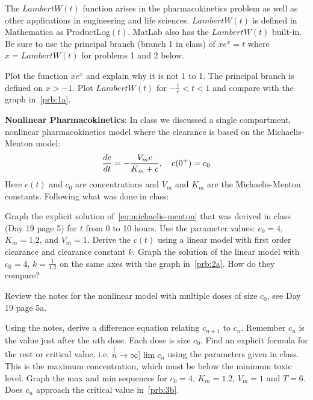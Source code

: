 \documentclass[
    number={8},
]{math486homework}
\begin{document}
\maketitle

The $LambertW(t)$ function arises in the pharmacokinetics problem as well as other applications in engineering and life sciences.
$LambertW(t)$ is defined in Mathematica as ProductLog$(t)$.
MatLab also has the $LambertW(t)$ built-in.
Be sure to use the principal branch (branch 1 in class) of $xe^{x} = t$ where $x = LambertW(t)$ for problems 1 and 2 below.

\begin{problems}
    \problem
    \begin{problems}
        \subproblem Plot the function $xe^{x}$ and explain why it is not 1 to 1.
        The principal branch is defined on $x > -1$. 
        \subproblem Plot $LambertW(t)$ for $-\frac{1}{e} < t < 1$ and compare with the graph in~\ref{prb:1a}. 
    \end{problems}
    \problem \textbf{Nonlinear Pharmacokinetics}: In class we discussed a single compartment, nonlinear pharmacokinetics model where the clearance is based on the Michaelis-Menton model:
    \begin{equation}
    	\frac{dc}{dt} = -\frac{V_{m}c}{K_{m} + c},\ \ \ c(0^{+}) = c_{0}\\
    	\label{eq:michaelis-menton}
    \end{equation}
    Here $c(t)$ and $c_{0}$ are concentrations and $V_{m}$ and $K_{m}$ are the Michaelis-Menton constants.
    Following what was done in class:
    \begin{problems}
        \subproblem Graph the explicit solution of~\eqref{eq:michaelis-menton} that was derived in class (Day 19 page 5) for $t$ from 0 to 10 hours.
        Use the parameter values: $c_{0} = 4$, $K_{m} = 1.2$, and $V_{m} = 1$. 
        \subproblem Derive the $c(t)$ using a linear model with first order clearance and clearance constant $k$.
        \subproblem Graph the solution of the linear model with $c_{0} = 4$, $k = \frac{1}{1.2}$ on the same axes with the graph in~\ref{prb:2a}.
        How do they compare? 
    \end{problems}
    \problem Review the notes for the nonlinear model with multiple doses of size $c_{0}$, see Day 19 page 5a.
    \begin{problems}
        \subproblem Using the notes, derive a difference equation relating $c_{n+1}$ to $c_{n}$.
        Remember $c_{n}$ is the value just after the $n$th dose.
        Each dose is size $c_{0}$. 
        \subproblem Find an explicit formula for the rest or critical value, i.e. $\stackrel[n\rightarrow \infty]{}{\lim} c_{n}$ using the parameters given in class.
        This is the maximum concentration, which must be below the minimum toxic level. 
        \subproblem Graph the max and min sequences for $c_{0} = 4$, $K_{m} = 1.2$, $V_{m} = 1$ and $T = 6$.
        Does $c_{n}$ approach the critical value in~\ref{prb:3b}. 
    \end{problems}
\end{problems}
\end{document}

